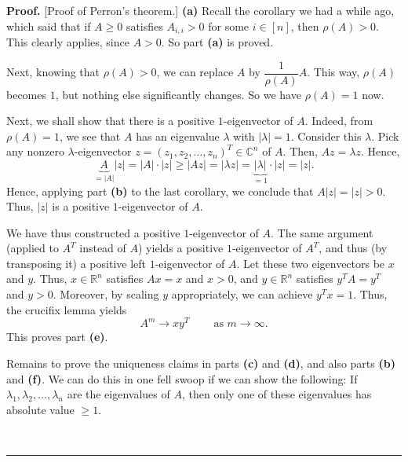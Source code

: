 \documentclass[numbers=enddot,12pt,final,onecolumn,notitlepage]{scrartcl}%
\numberwithin{exer}{subsection}
\theoremstyle{definition}
\newenvironment{proof}[1][Proof]{\noindent\textbf{#1.} }{\ \rule{0.5em}{0.5em}}
\begin{document}
\begin{proof}
[Proof of Perron's theorem.] \textbf{(a)} Recall the corollary we had a while
ago, which said that if $A\geq0$ satisfies $A_{i,i}>0$ for some $i\in\left[
n\right]  $, then $\rho\left(  A\right)  >0$. This clearly applies, since
$A>0$. So part \textbf{(a)} is proved.

Next, knowing that $\rho\left(  A\right)  >0$, we can replace $A$ by
$\dfrac{1}{\rho\left(  A\right)  }A$. This way, $\rho\left(  A\right)  $
becomes $1$, but nothing else significantly changes. So we have $\rho\left(
A\right)  =1$ now.

Next, we shall show that there is a positive $1$-eigenvector of $A$. Indeed,
from $\rho\left(  A\right)  =1$, we see that $A$ has an eigenvalue $\lambda$
with $\left\vert \lambda\right\vert =1$. Consider this $\lambda$. Pick any
nonzero $\lambda$-eigenvector $z=\left(  z_{1},z_{2},\ldots,z_{n}\right)
^{T}\in\mathbb{C}^{n}$ of $A$. Then, $Az=\lambda z$. Hence,%
\[
\underbrace{A}_{=\left\vert A\right\vert }\left\vert z\right\vert =\left\vert
A\right\vert \cdot\left\vert z\right\vert \geq\left\vert Az\right\vert
=\left\vert \lambda z\right\vert =\underbrace{\left\vert \lambda\right\vert
}_{=1}\cdot\left\vert z\right\vert =\left\vert z\right\vert .
\]
Hence, applying part \textbf{(b)} to the last corollary, we conclude that
$A\left\vert z\right\vert =\left\vert z\right\vert >0$. Thus, $\left\vert
z\right\vert $ is a positive $1$-eigenvector of $A$.

We have thus constructed a positive $1$-eigenvector of $A$. The same argument
(applied to $A^{T}$ instead of $A$) yields a positive $1$-eigenvector of
$A^{T}$, and thus (by transposing it) a positive left $1$-eigenvector of $A$.
Let these two eigenvectors be $x$ and $y$. Thus, $x\in\mathbb{R}^{n}$
satisfies $Ax=x$ and $x>0$, and $y\in\mathbb{R}^{n}$ satisfies $y^{T}A=y^{T}$
and $y>0$. Moreover, by scaling $y$ appropriately, we can achieve $y^{T}x=1$.
Thus, the crucifix lemma yields
\[
A^{m}\rightarrow xy^{T}\ \ \ \ \ \ \ \ \ \ \text{as }m\rightarrow\infty.
\]
This proves part \textbf{(e)}.

Remains to prove the uniqueness claims in parts \textbf{(c)} and \textbf{(d)},
and also parts \textbf{(b)} and \textbf{(f)}. We can do this in one fell swoop
if we can show the following: If $\lambda_{1},\lambda_{2},\ldots,\lambda_{n}$
are the eigenvalues of $A$, then only one of these eigenvalues has absolute
value $\geq1$.


\end{proof}
\end{document}
